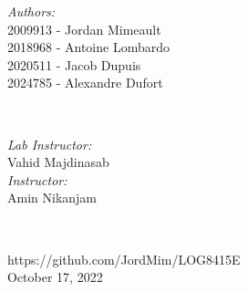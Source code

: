 \begin{titlepage}
\begin{minipage}{0.4\textwidth}
\begin{flushleft} \large
\emph{Authors:}\\
2009913 - Jordan Mimeault\\
2018968 - Antoine Lombardo\\
2020511 - Jacob Dupuis\\
2024785 - Alexandre Dufort\\[1.2em]
\end{flushleft}
\end{minipage}
~
\begin{minipage}{0.4\textwidth}
\begin{flushright} \large
\emph{Lab Instructor:} \\
Vahid Majdinasab  \\[1.2em] %
\emph{Instructor:} \\
Amin Nikanjam %
\end{flushright}
\end{minipage}\\[2cm]
\makeatother


{\large https://github.com/JordMim/LOG8415E}\\[2cm]


{\large October 17, 2022}\\[2cm] %

\vfill %

\end{titlepage}